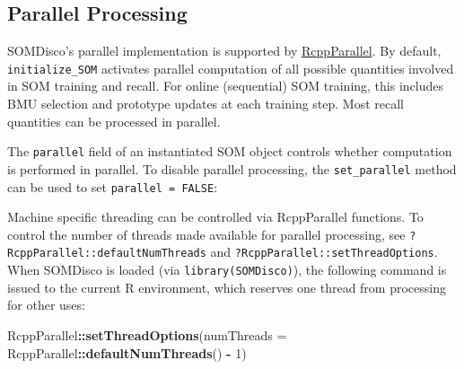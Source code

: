 \documentclass[]{article}
\newenvironment{Shaded}{\begin{snugshade}}{\end{snugshade}}
\newcommand{\CommentTok}[1]{\textcolor[rgb]{0.56,0.35,0.01}{\textit{#1}}}
\newcommand{\DataTypeTok}[1]{\textcolor[rgb]{0.13,0.29,0.53}{#1}}
\newcommand{\DecValTok}[1]{\textcolor[rgb]{0.00,0.00,0.81}{#1}}
\newcommand{\KeywordTok}[1]{\textcolor[rgb]{0.13,0.29,0.53}{\textbf{#1}}}
\newcommand{\NormalTok}[1]{#1}
\newcommand{\OperatorTok}[1]{\textcolor[rgb]{0.81,0.36,0.00}{\textbf{#1}}}
\newcommand{\OtherTok}[1]{\textcolor[rgb]{0.56,0.35,0.01}{#1}}
\newcommand{\StringTok}[1]{\textcolor[rgb]{0.31,0.60,0.02}{#1}}
\begin{document}
\hypertarget{parallel-processing}{%
\subsection{Parallel Processing}\label{parallel-processing}}

SOMDisco's parallel implementation is supported by \href{https://cran.r-project.org/web/packages/RcppParallel/index.html}{RcppParallel}. By default, \texttt{initialize\_SOM} activates parallel computation of all possible quantities involved in SOM training and recall. For online (sequential) SOM training, this includes BMU selection and prototype updates at each training step. Most recall quantities can be processed in parallel.

The \texttt{parallel} field of an instantiated SOM object controls whether computation is performed in parallel. To disable parallel processing, the \texttt{set\_parallel} method can be used to set \texttt{parallel\ =\ FALSE}:

\begin{Shaded}
\end{Shaded}

Machine specific threading can be controlled via RcppParallel functions. To control the number of threads made available for parallel processing, see \texttt{?RcppParallel::defaultNumThreads} and \texttt{?RcppParallel::setThreadOptions}. When SOMDisco is loaded (via \texttt{library(SOMDisco)}), the following command is issued to the current R environment, which reserves one thread from processing for other uses:

\begin{Shaded}
\begin{Highlighting}[]
\NormalTok{RcppParallel}\OperatorTok{::}\KeywordTok{setThreadOptions}\NormalTok{(}\DataTypeTok{numThreads =}\NormalTok{ RcppParallel}\OperatorTok{::}\KeywordTok{defaultNumThreads}\NormalTok{() }\OperatorTok{-}\StringTok{ }\DecValTok{1}\NormalTok{)}
\end{Highlighting}
\end{Shaded}
\end{document}
